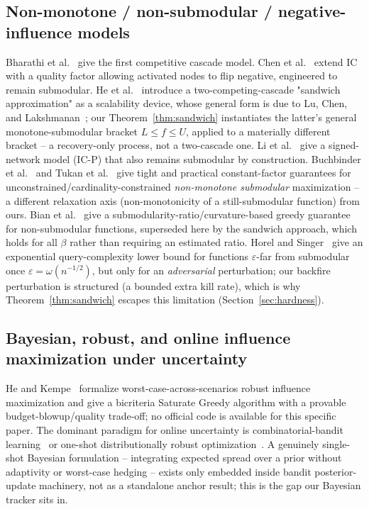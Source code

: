 \documentclass[journal]{IEEEtran}
\begin{document}
\subsection{Non-monotone / non-submodular / negative-influence models}
Bharathi et al.~\cite{bharathi2007competitive} give the first competitive
cascade model. Chen et al.~\cite{chen2011influence} extend IC with a quality
factor allowing activated nodes to flip negative, engineered to remain
submodular. He et al.~\cite{he2012influence} introduce a two-competing-cascade
"sandwich approximation" as a scalability device, whose general form is due
to Lu, Chen, and Lakshmanan~\cite{lu2015competition}; our
Theorem~\ref{thm:sandwich} instantiates the latter's general
monotone-submodular bracket $L\le f\le U$, applied to a materially different
bracket -- a recovery-only process, not a two-cascade one. Li et
al.~\cite{li2014influence} give a signed-network model (IC-P) that also
remains submodular by construction. Buchbinder et
al.~\cite{buchbinder2015tight} and Tukan et al.~\cite{tukan2024practical} give
tight and practical constant-factor guarantees for unconstrained/cardinality-constrained
\emph{non-monotone submodular} maximization -- a different relaxation
axis (non-monotonicity of a still-submodular function) from ours. Bian et
al.~\cite{bian2017guarantees} give a submodularity-ratio/curvature-based
greedy guarantee for non-submodular functions, superseded here by the
sandwich approach, which holds for all $\beta$ rather than requiring an
estimated ratio. Horel and Singer~\cite{horel2016maximization} give an
exponential query-complexity lower bound for functions
$\varepsilon$-far from submodular once $\varepsilon=\omega(n^{-1/2})$, but
only for an \emph{adversarial} perturbation; our backfire perturbation is
structured (a bounded extra kill rate), which is why Theorem~\ref{thm:sandwich}
escapes this limitation (Section~\ref{sec:hardness}).

\subsection{Bayesian, robust, and online influence maximization under uncertainty}
He and Kempe~\cite{he2016robust} formalize worst-case-across-scenarios robust
influence maximization and give a bicriteria Saturate Greedy algorithm with a
provable budget-blowup/quality trade-off; no official code is available for
this specific paper. The dominant paradigm for online uncertainty is
combinatorial-bandit learning~\cite{vaswani2015influence,wen2017online,chen2013combinatorial}
or one-shot distributionally robust
optimization~\cite{chen2020correlation,staib2019distributionally}. A
genuinely single-shot Bayesian formulation -- integrating expected spread
over a prior without adaptivity or worst-case hedging -- exists only
embedded inside bandit posterior-update machinery, not as a standalone
anchor result; this is the gap our Bayesian tracker sits in.
\end{document}
